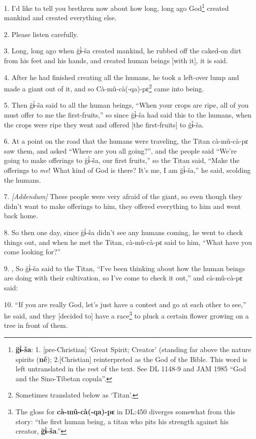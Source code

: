 \setcounter{footnote}{0}

1. I'd like to tell you brethren now about how long, long ago God\footnote{\textbf{g̈ɨ̀-ša}: 1. [pre-Christian] `Great Spirit; Creator' (standing far above the nature spirits (\textbf{nê}); 2.[Christian] reinterpreted as the God of the Bible. This word is left untranslated in the rest of the text. See DL 1148-9 and JAM 1985 ``God and the Sino-Tibetan copula''.} created mankind
and created everything else.

2. Please listen carefully.

3. Long, long ago when g̈ɨ̀-ša created mankind, he rubbed off the caked-on
dirt from his feet and his hands, and created human beings [with it], it is said.

4. After he had finished creating all the humans, he took a left-over lump and
made a giant out of it, and so Cà-mû-cà(-qa)-pɛ\footnote{Sometimes translated below as `Titan'.} came into being.

5. Then g̈ɨ̀-ša said to all the human beings, ``When your crops are ripe, all
of you must offer to me the first-fruits,'' so since g̈ɨ̀-ša had said this
to the humans, when the crops were ripe they went and offered [the first-fruits]
to g̈ɨ̀-ša.

6. At a point on the road that the humans were traveling, the Titan cà-mû-cà-pɛ
saw them, and asked ``Where are you all going?'', and the people said ``We're going
to make offerings to g̈ɨ̀-ša, our first fruits,'' so the Titan said, ``Make
the offerings to \textit{me}! What kind of God is there? It's me, I am g̈ɨ̀-ša,''
he said, scolding the humans.

7. \textit{[Addendum]} These people were very afraid of the giant, so even though
they didn't want to make offerings to him, they offered everything to him and went
back home.

8. So then one day, since g̈ɨ̀-ša didn't see any humans coming, he went to
check things out, and when he met the Titan, cà-mû-cà-pɛ said to him, ``What
have you come looking for?''

9. , So g̈ɨ̀-ša said to the Titan, ``I've been thinking about how the human beings
are doing with their cultivation, so I've come to check it out,'' and cà-mû-cà-pɛ
said:

10. ``If you are really God, let's just have a contest and go at each other to
see,'' he said, and they [decided to] have a race\footnote{The gloss for \textbf{cà-mû-cà(-qa)-pɛ} in DL:450 diverges somewhat from this story: ``the first human being, a titan who pits his strength against his creator, \textbf{g̈ɨ̀-ša}.''} to pluck a certain flower
growing on a tree in front of them.

